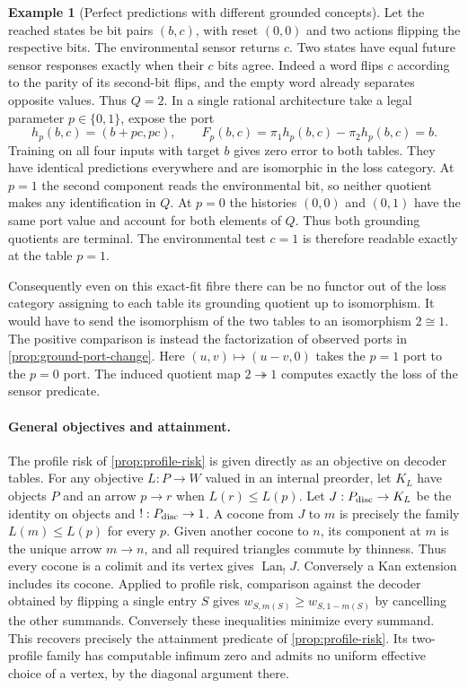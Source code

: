 \documentclass[11pt,a4paper]{article}
\theoremstyle{definition}
\newtheorem{example}[example]{Example}
\theoremstyle{remark}\newaliascnt{remark}{theorem}
\numberwithin{equation}{section}
\begin{document}
\begin{example}[Perfect predictions with different grounded concepts]\label{ex:fit-ground-distinction}
Let the reached states be bit pairs \((b,c)\), with reset \((0,0)\) and two actions flipping the respective bits. The environmental sensor returns \(c\). Two states have equal future sensor responses exactly when their \(c\) bits agree. Indeed a word flips \(c\) according to the parity of its second-bit flips, and the empty word already separates opposite values. Thus \(Q=2\). In a single rational architecture take a legal parameter \(p\in\{0,1\}\), expose the port
\[
 h_p(b,c)=(b+pc,pc),
 \qquad F_p(b,c)=\pi_1 h_p(b,c)-\pi_2 h_p(b,c)=b .
\]
Training on all four inputs with target \(b\) gives zero error to both tables. They have identical predictions everywhere and are isomorphic in the loss category. At \(p=1\) the second component reads the environmental bit, so neither quotient makes any identification in \(Q\). At \(p=0\) the histories \((0,0)\) and \((0,1)\) have the same port value and account for both elements of \(Q\). Thus both grounding quotients are terminal. The environmental test \(c=1\) is therefore readable exactly at the table \(p=1\).

Consequently even on this exact-fit fibre there can be no functor out of the loss category assigning to each table its grounding quotient up to isomorphism. It would have to send the isomorphism of the two tables to an isomorphism \(2\cong1\). The positive comparison is instead the factorization of observed ports in \cref{prop:ground-port-change}. Here \((u,v)\mapsto(u-v,0)\) takes the \(p=1\) port to the \(p=0\) port. The induced quotient map \(2\twoheadrightarrow1\) computes exactly the loss of the sensor predicate.
\end{example}

\paragraph{General objectives and attainment.}
The profile risk of \cref{prop:profile-risk} is given directly as an objective on decoder tables. For any objective \(L:P\to W\) valued in an internal preorder, let \(K_L\) have objects \(P\) and an arrow \(p\to r\) when \(L(r)\le L(p)\). Let \(J:P_{\rm disc}\to K_L\) be the identity on objects and \(!:P_{\rm disc}\to1\). A cocone from \(J\) to \(m\) is precisely the family \(L(m)\le L(p)\) for every \(p\). Given another cocone to \(n\), its component at \(m\) is the unique arrow \(m\to n\), and all required triangles commute by thinness. Thus every cocone is a colimit and its vertex gives \(\operatorname{Lan}_{!}J\). Conversely a Kan extension includes its cocone. Applied to profile risk, comparison against the decoder obtained by flipping a single entry \(S\) gives \(w_{S,m(S)}\ge w_{S,1-m(S)}\) by cancelling the other summands. Conversely these inequalities minimize every summand. This recovers precisely the attainment predicate of \cref{prop:profile-risk}. Its two-profile family has computable infimum zero and admits no uniform effective choice of a vertex, by the diagonal argument there.
\end{document}
